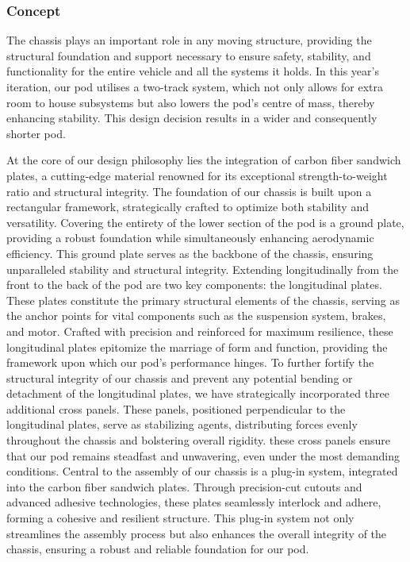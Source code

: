 \subsubsection{Concept}

The chassis plays an important role in any moving structure, providing the structural foundation and support necessary to ensure safety, stability, and functionality for the entire vehicle and all the systems it holds. In this year's iteration, our pod utilises a two-track system, which not only allows for extra room to house subsystems but also lowers the pod's centre of mass, thereby enhancing stability. This design decision results in a wider and consequently shorter pod.

At the core of our design philosophy lies the integration of carbon fiber sandwich plates, a cutting-edge material renowned for its exceptional strength-to-weight ratio and structural integrity.
The foundation of our chassis is built upon a rectangular framework, strategically crafted to optimize both stability and versatility. Covering the entirety of the lower section of the pod is a ground plate, providing a robust foundation while simultaneously enhancing aerodynamic efficiency. This ground plate serves as the backbone of the chassis, ensuring unparalleled stability and structural integrity.
Extending longitudinally from the front to the back of the pod are two key components: the longitudinal plates. These plates constitute the primary structural elements of the chassis, serving as the anchor points for vital components such as the suspension system, brakes, and motor. Crafted with precision and reinforced for maximum resilience, these longitudinal plates epitomize the marriage of form and function, providing the framework upon which our pod's performance hinges.
To further fortify the structural integrity of our chassis and prevent any potential bending or detachment of the longitudinal plates, we have strategically incorporated three additional cross panels. These panels, positioned perpendicular to the longitudinal plates, serve as stabilizing agents, distributing forces evenly throughout the chassis and bolstering overall rigidity. these cross panels ensure that our pod remains steadfast and unwavering, even under the most demanding conditions.
Central to the assembly of our chassis is a plug-in system, integrated into the carbon fiber sandwich plates. Through precision-cut cutouts and advanced adhesive technologies, these plates seamlessly interlock and adhere, forming a cohesive and resilient structure. This plug-in system not only streamlines the assembly process but also enhances the overall integrity of the chassis, ensuring a robust and reliable foundation for our pod.

